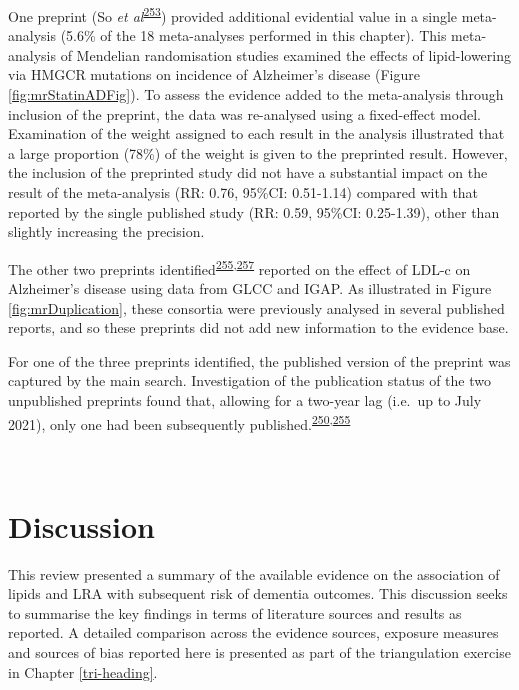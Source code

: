 \documentclass[a4paper, twoside]{templates/ociamthesis}
\begin{document}
One preprint (So \emph{et al}\textsuperscript{\protect\hyperlink{ref-so2017}{253}}) provided additional evidential value in a single meta-analysis (5.6\% of the 18 meta-analyses performed in this chapter). This meta-analysis of Mendelian randomisation studies examined the effects of lipid-lowering via HMGCR mutations on incidence of Alzheimer's disease (Figure \ref{fig:mrStatinADFig}). To assess the evidence added to the meta-analysis through inclusion of the preprint, the data was re-analysed using a fixed-effect model. Examination of the weight assigned to each result in the analysis illustrated that a large proportion (78\%) of the weight is given to the preprinted result. However, the inclusion of the preprinted study did not have a substantial impact on the result of the meta-analysis (RR: 0.76, 95\%CI: 0.51-1.14) compared with that reported by the single published study (RR: 0.59, 95\%CI: 0.25-1.39), other than slightly increasing the precision.

The other two preprints identified\textsuperscript{\protect\hyperlink{ref-andrews2019}{255},\protect\hyperlink{ref-zhu2017}{257}} reported on the effect of LDL-c on Alzheimer's disease using data from GLCC and IGAP. As illustrated in Figure \ref{fig:mrDuplication}, these consortia were previously analysed in several published reports, and so these preprints did not add new information to the evidence base.

For one of the three preprints identified, the published version of the preprint was captured by the main search. Investigation of the publication status of the two unpublished preprints found that, allowing for a two-year lag (i.e.~up to July 2021), only one had been subsequently published.\textsuperscript{\protect\hyperlink{ref-andrews2021}{250},\protect\hyperlink{ref-andrews2019}{255}}

~

\hypertarget{discussion-1}{%
\section{Discussion}\label{discussion-1}}

This review presented a summary of the available evidence on the association of lipids and LRA with subsequent risk of dementia outcomes. This discussion seeks to summarise the key findings in terms of literature sources and results as reported. A detailed comparison across the evidence sources, exposure measures and sources of bias reported here is presented as part of the triangulation exercise in Chapter \ref{tri-heading}.
\end{document}
